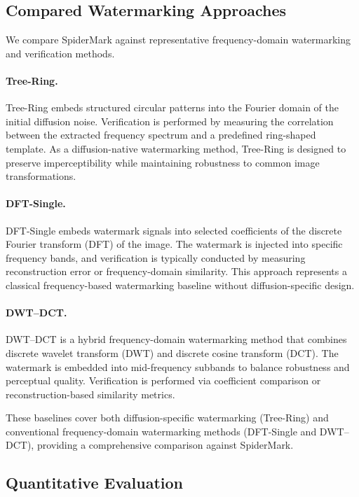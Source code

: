 \documentclass[lettersize,journal,review]{IEEEtran}
\begin{document}
\subsection{Compared Watermarking Approaches}
\label{subsec:compared_methods}

We compare SpiderMark against representative frequency-domain watermarking and verification methods.

\paragraph{Tree-Ring.}
Tree-Ring \cite{wen2023tree_ring} embeds structured circular patterns into the Fourier domain of the initial diffusion noise. 
Verification is performed by measuring the correlation between the extracted frequency spectrum and a predefined ring-shaped template. 
As a diffusion-native watermarking method, Tree-Ring is designed to preserve imperceptibility while maintaining robustness to common image transformations.

\paragraph{DFT-Single.}
DFT-Single embeds watermark signals into selected coefficients of the discrete Fourier transform (DFT) of the image. 
The watermark is injected into specific frequency bands, and verification is typically conducted by measuring reconstruction error or frequency-domain similarity. 
This approach represents a classical frequency-based watermarking baseline without diffusion-specific design.

\paragraph{DWT--DCT.}
DWT--DCT is a hybrid frequency-domain watermarking method that combines discrete wavelet transform (DWT) and discrete cosine transform (DCT). 
The watermark is embedded into mid-frequency subbands to balance robustness and perceptual quality. 
Verification is performed via coefficient comparison or reconstruction-based similarity metrics.

These baselines cover both diffusion-specific watermarking (Tree-Ring) and conventional frequency-domain watermarking methods (DFT-Single and DWT--DCT), providing a comprehensive comparison against SpiderMark.



\subsection{Quantitative Evaluation}
\end{document}
